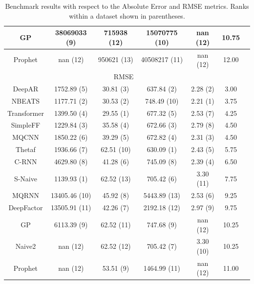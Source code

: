 \begin{table}[htb]
\begin{tabular}{ccccccc}
        GP          & 38069033 (9)          & 715938 (12)            & 15070775 (10)      & nan (12)     & 10.75               \\\hline
        Prophet     & nan (12)              & 950621 (13)            & 40508217 (11)      & nan (12)     & 12.00               \\\hline
        \multicolumn{6}{c}{\cellcolor{gray!25}RMSE}                                                                            \\
        \hline
        DeepAR      & 1752.89 (5)           & 30.81 (3)              & 637.84 (2)         & 2.28 (2)     & 3.00                \\\hline
        NBEATS      & 1177.71 (2)           & 30.53 (2)              & 748.49 (10)        & 2.21 (1)     & 3.75                \\\hline
        Transformer & 1399.50 (4)           & 29.55 (1)              & 677.32 (5)         & 2.53 (7)     & 4.25                \\\hline
        SimpleFF    & 1229.84 (3)           & 35.58 (4)              & 672.66 (3)         & 2.79 (8)     & 4.50                \\\hline
        MQCNN       & 1850.22 (6)           & 39.29 (5)              & 672.82 (4)         & 2.31 (3)     & 4.50                \\\hline
        Thetaf      & 1936.66 (7)           & 62.51 (10)             & 630.09 (1)         & 2.43 (5)     & 5.75                \\\hline
        C-RNN       & 4629.80 (8)           & 41.28 (6)              & 745.09 (8)         & 2.39 (4)     & 6.50                \\\hline
        S-Naive     & 1139.93 (1)           & 62.52 (13)             & 705.42 (6)         & 3.30 (11)    & 7.75                \\\hline
        MQRNN       & 13405.46 (10)         & 45.92 (8)              & 5443.89 (13)       & 2.53 (6)     & 9.25                \\\hline
        DeepFactor  & 13505.91 (11)         & 42.26 (7)              & 2192.18 (12)       & 2.97 (9)     & 9.75                \\\hline
        GP          & 6113.39 (9)           & 62.52 (11)             & 747.68 (9)         & nan (12)     & 10.25               \\\hline
        Naive2      & nan (12)              & 62.52 (12)             & 705.42 (7)         & 3.30 (10)    & 10.25               \\\hline
        Prophet     & nan (12)              & 53.51 (9)              & 1464.99 (11)       & nan (12)     & 11.00               \\\hline
    \end{tabular}
    \caption{Benchmark results with respect to the Absolute Error and RMSE metrics. Ranks within a dataset shown in parentheses.}
    \label{tab:benchmark_results_abs_rmse}
\end{table}

